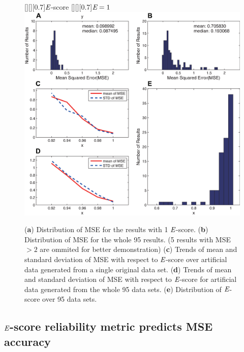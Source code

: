 \begin{figure}
\centering
	[][][0.7]{${\emph{E}}$-score}
	[][][0.7]{${\emph{E}}=1$}
\includegraphics[width=0.9\linewidth]{figures/result_escore_mse4}
\caption{(\textbf{a}) Distribution of MSE for the results with 1 ${\emph{E}}$-score. (\textbf{b}) Distribution of MSE for the whole 95 results. (5 results with MSE $> 2$ are ommited for better demonstration) (\textbf{c}) Trends of mean and standard deviation of MSE with respect to ${\emph{E}}$-score over artificial data generated from a single original data set. (\textbf{d}) Trends of mean and standard deviation of MSE with respect to ${\emph{E}}$-score for artificial data generated from the whole 95 data sets. (\textbf{e}) Distribution of ${\emph{E}}$-score over 95 data sets.}
\label{f:escore-mse}
\end{figure}

\subsection{${\emph{E}}$-score reliability metric predicts MSE accuracy}

